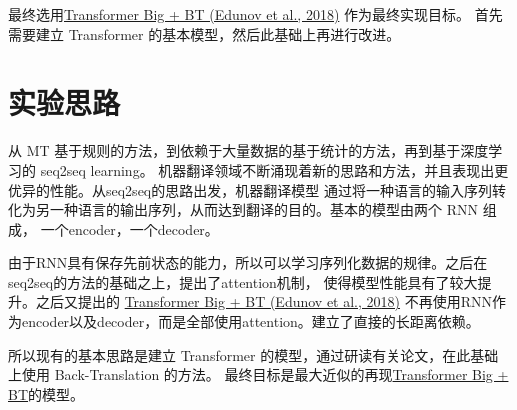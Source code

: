\documentclass[UTF8,a4paper,10pt]{ctexart}
\begin{document}
  最终选用\href{https://arxiv.org/pdf/1808.09381.pdf}{\color{blue}Transformer Big + BT (Edunov et al., 2018)} 作为最终实现目标。
  首先需要建立 Transformer 的基本模型，然后此基础上再进行改进。


\section{实验思路}

   从 MT 基于规则的方法，到依赖于大量数据的基于统计的方法，再到基于深度学习的 seq2seq learning。
   机器翻译领域不断涌现着新的思路和方法，并且表现出更优异的性能。从seq2seq的思路出发，机器翻译模型
   通过将一种语言的输入序列转化为另一种语言的输出序列，从而达到翻译的目的。基本的模型由两个 RNN 组成，
   一个encoder，一个decoder。
   

   由于RNN具有保存先前状态的能力，所以可以学习序列化数据的规律。之后在seq2seq的方法的基础之上，提出了attention机制，
   使得模型性能具有了较大提升。之后又提出的 \href{https://arxiv.org/pdf/1808.09381.pdf}{\color{blue}Transformer Big + BT (Edunov et al., 2018)} 
   不再使用RNN作为encoder$以及$decoder，而是全部使用attention。建立了直接的长距离依赖。


   所以现有的基本思路是建立 Transformer 的模型，通过研读有关论文，在此基础上使用 Back-Translation 的方法。
   最终目标是最大近似的再现\href{https://arxiv.org/pdf/1808.09381.pdf}{\color{blue}Transformer Big + BT}的模型。
\end{document}
